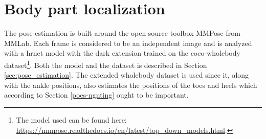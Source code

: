 

%
%





\section{Body part localization} \label{sec:met-loc}
The pose estimation is built around the open-source toolbox MMPose \cite{mmpose} from MMLab. Each frame is considered to be an independent image and is analyzed with a \gls{hrnet} model with the \gls{dark} extension trained on the \gls{coco}-wholebody dataset\footnote{The model used can be found here: \url{https://mmpose.readthedocs.io/en/latest/top_down_models.html}.}. Both the model and the dataset is described in Section \ref{sec:pose_estimation}. The extended wholebody dataset is used since it, along with the ankle positions, also estimates the positions of the toes and heels which according to Section \ref{poes-ngnting} ought to be important. %

